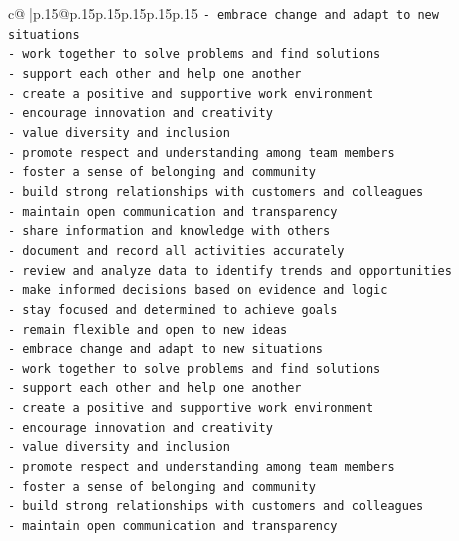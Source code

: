 \documentclass{article}
\begin{document}
{\begin{supertabular}{c@{$\;$}|p{.15\linewidth}@{}p{.15\linewidth}p{.15\linewidth}p{.15\linewidth}p{.15\linewidth}p{.15\linewidth}}
{{{\texttt{{-} embrace change and adapt to new situations} \\
\texttt{{-} work together to solve problems and find solutions} \\
\texttt{{-} support each other and help one another} \\
\texttt{{-} create a positive and supportive work environment} \\
\texttt{{-} encourage innovation and creativity} \\
\texttt{{-} value diversity and inclusion} \\
\texttt{{-} promote respect and understanding among team members} \\
\texttt{{-} foster a sense of belonging and community} \\
\texttt{{-} build strong relationships with customers and colleagues} \\
\texttt{{-} maintain open communication and transparency} \\
\texttt{{-} share information and knowledge with others} \\
\texttt{{-} document and record all activities accurately} \\
\texttt{{-} review and analyze data to identify trends and opportunities} \\
\texttt{{-} make informed decisions based on evidence and logic} \\
\texttt{{-} stay focused and determined to achieve goals} \\
\texttt{{-} remain flexible and open to new ideas} \\
\texttt{{-} embrace change and adapt to new situations} \\
\texttt{{-} work together to solve problems and find solutions} \\
\texttt{{-} support each other and help one another} \\
\texttt{{-} create a positive and supportive work environment} \\
\texttt{{-} encourage innovation and creativity} \\
\texttt{{-} value diversity and inclusion} \\
\texttt{{-} promote respect and understanding among team members} \\
\texttt{{-} foster a sense of belonging and community} \\
\texttt{{-} build strong relationships with customers and colleagues} \\
\texttt{{-} maintain open communication and transparency} \\
}}}
\end{supertabular}}
\end{document}
